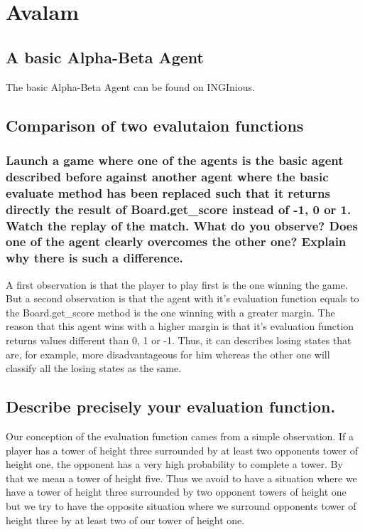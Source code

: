 \documentclass[10pt,a4paper]{article}
\begin{document}
\section{Avalam}

\subsection{A basic Alpha-Beta Agent}

The basic Alpha-Beta Agent can be found on INGInious.

\subsection{Comparison of two evalutaion functions}

\subsubsection{Launch a game where one of the agents is the basic agent described before against another agent where the basic evaluate method has been replaced such that it returns directly the result of Board.get\_score instead of -1, 0 or 1. Watch the replay of the match. What do you observe? Does one of the agent clearly overcomes the other one? Explain why there is such a difference.}

A first observation is that the player to play first is the one winning the game. But a second observation is that the agent with it's evaluation function equals to the Board.get\_score method is the one winning with a greater margin. The reason that this agent wins with a higher margin is that it's evaluation function returns values different than 0, 1 or -1. Thus, it can describes  losing states that are, for example, more disadvantageous for him whereas the other one will classify all the losing states as the same.


\subsection{Describe precisely your evaluation function.}
Our conception of the evaluation function cames from a simple observation. If a player has a tower of height three surrounded by at least two opponents tower of height one, the opponent has a very high probability to complete a tower. By that we mean a tower of height five. Thus we avoid to have a situation where we have a tower of height three surrounded by two opponent towers of height one but we try to have the opposite situation where we surround opponents tower of height three by at least two of our tower of height one. \\
\end{document}
